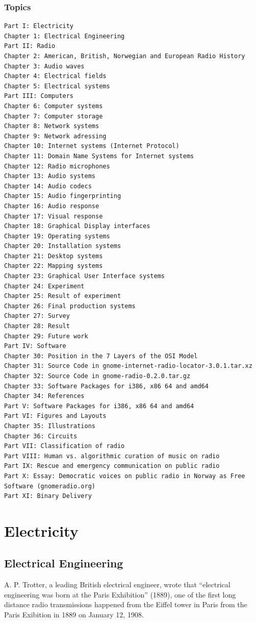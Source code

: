 \documentclass[a4paper,norsk,utf8]{report}
\begin{document}
\section*{Topics}
\begin{verbatim}
Part I: Electricity
Chapter 1: Electrical Engineering
Part II: Radio
Chapter 2: American, British, Norwegian and European Radio History
Chapter 3: Audio waves
Chapter 4: Electrical fields
Chapter 5: Electrical systems
Part III: Computers
Chapter 6: Computer systems
Chapter 7: Computer storage
Chapter 8: Network systems
Chapter 9: Network adressing
Chapter 10: Internet systems (Internet Protocol)
Chapter 11: Domain Name Systems for Internet systems
Chapter 12: Radio microphones
Chapter 13: Audio systems
Chapter 14: Audio codecs
Chapter 15: Audio fingerprinting
Chapter 16: Audio response
Chapter 17: Visual response
Chapter 18: Graphical Display interfaces
Chapter 19: Operating systems
Chapter 20: Installation systems
Chapter 21: Desktop systems
Chapter 22: Mapping systems
Chapter 23: Graphical User Interface systems
Chapter 24: Experiment
Chapter 25: Result of experiment
Chapter 26: Final production systems
Chapter 27: Survey
Chapter 28: Result
Chapter 29: Future work
Part IV: Software
Chapter 30: Position in the 7 Layers of the OSI Model
Chapter 31: Source Code in gnome-internet-radio-locator-3.0.1.tar.xz
Chapter 32: Source Code in gnome-radio-0.2.0.tar.gz
Chapter 33: Software Packages for i386, x86 64 and amd64
Chapter 34: References
Part V: Software Packages for i386, x86 64 and amd64
Part VI: Figures and Layouts
Chapter 35: Illustrations
Chapter 36: Circuits
Part VII: Classification of radio
Part VIII: Human vs. algorithmic curation of music on radio
Part IX: Rescue and emergency communication on public radio
Part X: Essay: Democratic voices on public radio in Norway as Free Software (gnomeradio.org)
Part XI: Binary Delivery
\end{verbatim}

\newpage

\part{Electricity}

\chapter{Electrical Engineering}

    A. P. Trotter, a leading British electrical engineer, wrote that
    ``electrical engineering was born at the Paris Exhibition'' (1889),
    one of the first long distance radio transmissions happened from the
    Eiffel tower in Paris from the Paris Exibition in 1889 on January 12, 1908.
\end{document}
